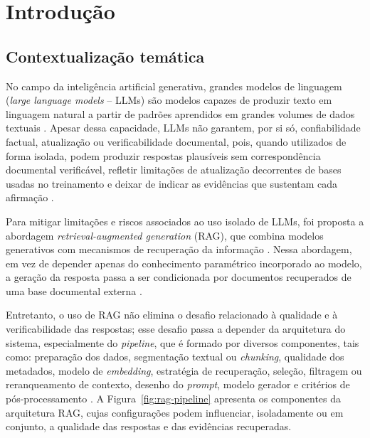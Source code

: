 \section{Introdução}

\subsection{Contextualização temática}

No campo da inteligência artificial generativa, grandes modelos de linguagem (\textit{large language models} -- LLMs) são modelos capazes de produzir texto em linguagem natural a partir de padrões aprendidos em grandes volumes de dados textuais \parencite{brownEtAl2020fewShotLearners,zhaoEtAl2023llmSurvey,minaee2024llmSurvey}. Apesar dessa capacidade, LLMs não garantem, por si só, confiabilidade factual, atualização ou verificabilidade documental, pois, quando utilizados de forma isolada, podem produzir respostas plausíveis sem correspondência documental verificável, refletir limitações de atualização decorrentes de bases usadas no treinamento e deixar de indicar as evidências que sustentam cada afirmação \parencite{jiEtAl2023hallucinationSurvey,anhHoang2025hallucinations,dahlEtAl2024largeLegalFictions}.

Para mitigar limitações e riscos associados ao uso isolado de LLMs, foi proposta a abordagem \textit{retrieval-augmented generation} (RAG), que combina modelos generativos com mecanismos de recuperação da informação \parencite{lewisEtAl2020rag}. Nessa abordagem, em vez de depender apenas do conhecimento paramétrico incorporado ao modelo, a geração da resposta passa a ser condicionada por documentos recuperados de uma base documental externa \parencite{lewisEtAl2020rag,gao2023ragSurvey}.

Entretanto, o uso de RAG não elimina o desafio relacionado à qualidade e à verificabilidade das respostas; esse desafio passa a depender da arquitetura do sistema, especialmente do \textit{pipeline}, que é formado por diversos componentes, tais como: preparação dos dados, segmentação textual ou \textit{chunking}, qualidade dos metadados, modelo de \textit{embedding}, estratégia de recuperação, seleção, filtragem ou reranqueamento de contexto, desenho do \textit{prompt}, modelo gerador e critérios de pós-processamento \parencite{gao2023ragSurvey,gupta2024comprehensiveRag,gao2024modularRag}. A Figura~\ref{fig:rag-pipeline} apresenta os componentes da arquitetura RAG, cujas configurações podem influenciar, isoladamente ou em conjunto, a qualidade das respostas e das evidências recuperadas.

